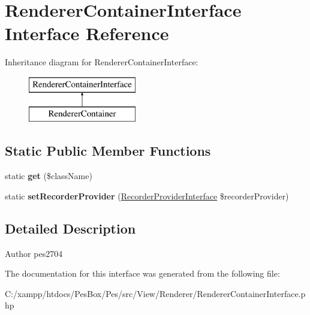 \hypertarget{interface_pes_1_1_view_1_1_renderer_1_1_renderer_container_interface}{}\section{Renderer\+Container\+Interface Interface Reference}
\label{interface_pes_1_1_view_1_1_renderer_1_1_renderer_container_interface}
Inheritance diagram for Renderer\+Container\+Interface\+:\begin{figure}[H]
\begin{center}
\leavevmode
\includegraphics[height=2.000000cm]{interface_pes_1_1_view_1_1_renderer_1_1_renderer_container_interface}
\end{center}
\end{figure}
\subsection*{Static Public Member Functions}
\begin{DoxyCompactItemize}
\item 
\mbox{\label{interface_pes_1_1_view_1_1_renderer_1_1_renderer_container_interface_a0df693c0d02fe85325f46e6ce9a1ffb6}} 
static {\bfseries get} (\$class\+Name)
\item 
\mbox{\label{interface_pes_1_1_view_1_1_renderer_1_1_renderer_container_interface_a068b4012f760f18deb809c5836409a52}} 
static {\bfseries set\+Recorder\+Provider} (\mbox{\hyperlink{interface_pes_1_1_view_1_1_recorder_1_1_recorder_provider_interface}{Recorder\+Provider\+Interface}} \$recorder\+Provider)
\end{DoxyCompactItemize}


\subsection{Detailed Description}
\begin{DoxyAuthor}{Author}
pes2704 
\end{DoxyAuthor}


The documentation for this interface was generated from the following file\+:\begin{DoxyCompactItemize}
\item 
C\+:/xampp/htdocs/\+Pes\+Box/\+Pes/src/\+View/\+Renderer/Renderer\+Container\+Interface.\+php\end{DoxyCompactItemize}

